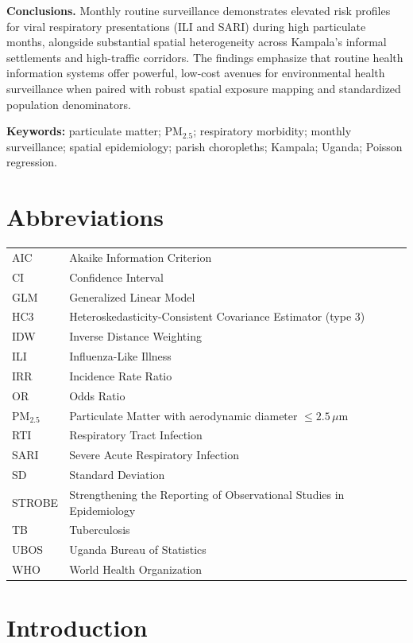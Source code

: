 \documentclass[12pt,a4paper]{report}
\newcommand{\pmfive}{PM$_{2.5}$}
\begin{document}
\noindent\textbf{Conclusions.} Monthly routine surveillance demonstrates elevated risk profiles for viral respiratory presentations (ILI and SARI) during high particulate months, alongside substantial spatial heterogeneity across Kampala's informal settlements and high-traffic corridors. The findings emphasize that routine health information systems offer powerful, low-cost avenues for environmental health surveillance when paired with robust spatial exposure mapping and standardized population denominators.

\vspace{0.5cm}
\noindent\textbf{Keywords:} particulate matter; \pmfive{}; respiratory morbidity; monthly surveillance; spatial epidemiology; parish choropleths; Kampala; Uganda; Poisson regression.

\chapter*{Abbreviations}
\begin{tabular}{ll}
AIC & Akaike Information Criterion \\
CI & Confidence Interval \\
GLM & Generalized Linear Model \\
HC3 & Heteroskedasticity-Consistent Covariance Estimator (type 3) \\
IDW & Inverse Distance Weighting \\
ILI & Influenza-Like Illness \\
IRR & Incidence Rate Ratio \\
OR & Odds Ratio \\
\pmfive{} & Particulate Matter with aerodynamic diameter $\leq 2.5\,\mu$m \\
RTI & Respiratory Tract Infection \\
SARI & Severe Acute Respiratory Infection \\
SD & Standard Deviation \\
STROBE & Strengthening the Reporting of Observational Studies in Epidemiology \\
TB & Tuberculosis \\
UBOS & Uganda Bureau of Statistics \\
WHO & World Health Organization \\
\end{tabular}

\tableofcontents
\clearpage
{}

\chapter{Introduction}
\end{document}
